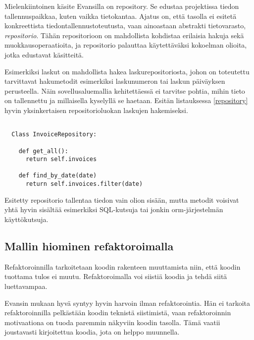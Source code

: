 Mielenkiintoinen käsite Evansilla on \gls{repository}. Se edustaa
projektissa tiedon tallennuspaikkaa, kuten vaikka tietokantaa. Ajatus
on, että  tasolla ei esitetä
konkreettista tiedontallennustoteutusta, vaan ainoastaan abstrakti
tietovarasto, \emph{repositorio}. Tähän repositorioon on mahdollista
kohdistaa erilaisia hakuja sekä muokkausoperaatioita, ja repositorio
palauttaa käytettäväksi kokoelman olioita, jotka edustavat
 käsitteitä.

Esimerkiksi laskut on mahdollista hakea laskurepositoriosta, johon on
toteutettu tarvittavat hakumetodit esimerkiksi laskunumeron tai laskun
päiväyksen perusteella. Näin sovellusaluemallia kehitettäessä ei
tarvitse pohtia, mihin tieto on tallennettu ja millaisella kyselyllä se
haetaan. Esitän listauksessa \ref{repository} hyvin yksinkertaisen
repositorioluokan laskujen hakemiseksi.

\begin{code}
  \begin{verbatim}
  
  Class InvoiceRepository:
  
    def get_all():
      return self.invoices
      
    def find_by_date(date)
      return self.invoices.filter(date)

\end{verbatim}
  \label{repository}
\end{code}

Esitetty repositorio tallentaa tiedon vain olion sisään, mutta metodit
voisivat yhtä hyvin sisältää esimerkiksi SQL-kutsuja tai jonkin
\gls{orm}-järjestelmän käyttökutsuja.

\hypertarget{mallin-hiominen-refaktoroimalla}{%
\subsection{Mallin hiominen
refaktoroimalla}\label{mallin-hiominen-refaktoroimalla}}

Refaktoroinnilla tarkoitetaan koodin rakenteen muuttamista niin, että
koodin tuottama tulos ei muutu. Refaktoroimalla voi siistiä koodia ja
tehdä siitä luettavampaa.

Evansin mukaan hyvä  syntyy hyvin harvoin
ilman refaktorointia. Hän ei tarkoita refaktoroinnilla pelkästään koodin
teknistä siistimistä, vaan refaktoroinnin motivaationa on tuoda
 paremmin näkyviin koodin tasolla. Tämä vaatii
joustavasti kirjoitettua koodia, jota on helppo
muunnella.\cite[osa 3.]{evans:ddd}

